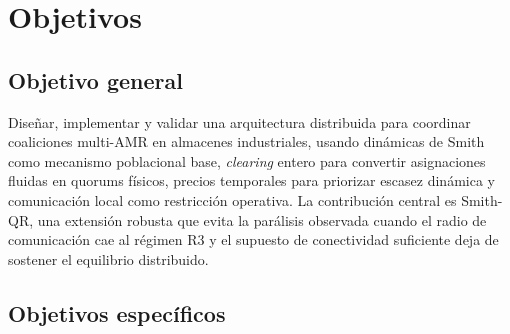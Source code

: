 \section{Objetivos}
\label{sec:objetivos}

\subsection{Objetivo general}

Diseñar, implementar y validar una arquitectura distribuida para coordinar coaliciones
multi-AMR en almacenes industriales, usando dinámicas de Smith como mecanismo
poblacional base, \emph{clearing} entero para convertir asignaciones fluidas en quorums
físicos, precios temporales para priorizar escasez dinámica y comunicación local como
restricción operativa. La contribución central es Smith-QR, una extensión
robusta que evita la parálisis observada cuando el radio de comunicación cae al régimen
R3 y el supuesto de conectividad suficiente deja de sostener el equilibrio distribuido.

\subsection{Objetivos específicos}

